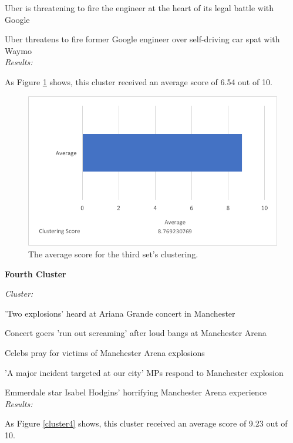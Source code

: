 \documentclass[12pt]{article}
\begin{document}
Uber is threatening to fire the engineer at the heart of its legal battle with Google

Uber threatens to fire former Google engineer over self-driving car spat with Waymo \\

\emph{Results:}

As Figure \ref{cluster3} shows, this cluster received an average score of 6.54 out of 10. \\

\begin{figure}[ht!]
  \centering
    \includegraphics[scale=0.7]{cluster3score.png}
   \caption[The average score for a cluster]{The average score for the third set's clustering.}
   \label{cluster3}
\end{figure} 

\textbf{Fourth Cluster}

\emph{Cluster:}

'Two explosions' heard at Ariana Grande concert in Manchester

Concert goers 'run out screaming' after loud bangs at Manchester Arena

Celebs pray for victims of Manchester Arena explosions

'A major incident targeted at our city' MPs respond to Manchester explosion

Emmerdale star Isabel Hodgins' horrifying Manchester Arena experience \\

\emph{Results:}

As Figure \ref{cluster4} shows, this cluster received an average score of 9.23 out of 10. \\
\end{document}
